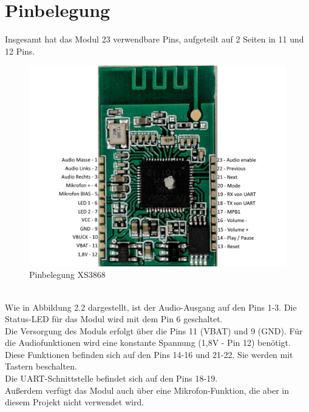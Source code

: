 \section{Pinbelegung}
Insgesamt hat das Modul 23 verwendbare Pins, aufgeteilt auf 2 Seiten in 11 und 12 Pins. 
\begin{figure} [h]
	\centering
	\caption{Pinbelegung XS3868}
	\includegraphics[width=1\textwidth]{img/XS3868_Pinbelegung.png}
\end{figure}\\
Wie in Abbildung 2.2 dargestellt, ist der Audio-Ausgang auf den Pins 1-3. Die Status-LED für das Modul wird mit dem Pin 6 geschaltet.\\
Die Versorgung des Moduls erfolgt über die Pins 11 (VBAT) und 9 (GND). Für die Audiofunktionen wird eine konstante Spannung (1,8V - Pin 12) benötigt. Diese Funktionen befinden sich auf den Pins 14-16 und 21-22. Sie werden mit Tastern beschalten.\\
Die UART-Schnittstelle befindet sich auf den Pins 18-19.\\
Außerdem verfügt das Modul auch über eine Mikrofon-Funktion, die aber in diesem Projekt nicht verwendet wird.


